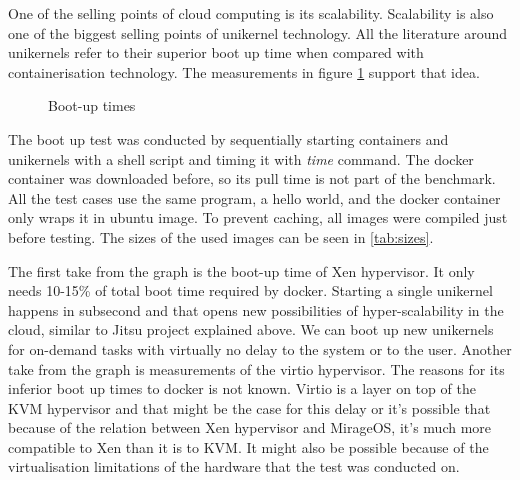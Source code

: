 One of the selling points of cloud computing is its scalability. Scalability is also one of the biggest selling points of unikernel technology. All the literature around unikernels refer to their superior boot up time when compared with containerisation technology. The measurements in figure \ref{fig:boot-up} support that idea.
\begin{figure}[htpb]
  \centering
    \caption{Boot-up times}\label{fig:boot-up}
  \end{figure}

The boot up test was conducted by sequentially starting containers and unikernels with a shell script and timing it with \textit{time} command. The docker container was downloaded before, so its pull time is not part of the benchmark. All the test cases use the same program, a hello world, and the docker container only wraps it in ubuntu image. To prevent caching, all images were compiled just before testing. The sizes of the used images can be seen in \ref{tab:sizes}.

The first take from the graph is the boot-up time of Xen hypervisor. It only needs 10-15\% of total boot time required by docker. Starting a single unikernel happens in subsecond and that opens new possibilities of hyper-scalability in the cloud, similar to Jitsu project explained above. We can boot up new unikernels for on-demand tasks with virtually no delay to the system or to the user. Another take from the graph is measurements of the virtio \cite{virtio} hypervisor. The reasons for its inferior boot up times to docker is not known. Virtio is a layer on top of the KVM hypervisor and that might be the case for this delay or it's possible that because of the relation between Xen hypervisor and MirageOS, it's much more compatible to Xen than it is to KVM. It might also be possible because of the virtualisation limitations of the hardware that the test was conducted on.

